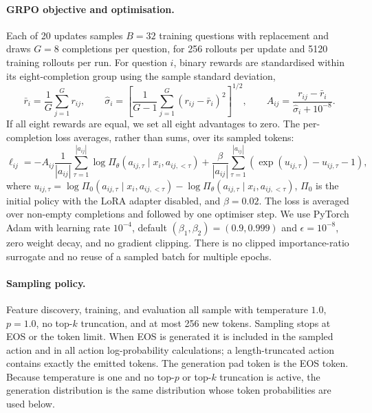 \paragraph{GRPO objective and optimisation.}
Each of 20 updates samples $B=32$ training questions with replacement and
draws $G=8$ completions per question, for 256 rollouts per update and 5120
training rollouts per run.  For question $i$, binary rewards are standardised
within its eight-completion group using the sample standard deviation,
\begin{equation*}
\bar r_i=\frac{1}{G}\sum_{j=1}^{G}r_{ij},
\qquad
\widehat{\sigma}_i
=
\left[\frac{1}{G-1}\sum_{j=1}^{G}(r_{ij}-\bar r_i)^2\right]^{1/2},
\qquad
A_{ij}=\frac{r_{ij}-\bar r_i}{\widehat{\sigma}_i+10^{-8}}.
\end{equation*}
If all eight rewards are equal, we set all eight advantages to zero.  The
per-completion loss averages, rather than sums, over its sampled tokens:
\begin{equation*}
\ell_{ij}
=
-A_{ij}\frac{1}{|a_{ij}|}\sum_{\tau=1}^{|a_{ij}|}
\log\Pi_\theta(a_{ij,\tau}\mid x_i,a_{ij,<\tau})
+
\frac{\beta}{|a_{ij}|}\sum_{\tau=1}^{|a_{ij}|}
\left(\exp(u_{ij,\tau})-u_{ij,\tau}-1\right),
\end{equation*}
where
$u_{ij,\tau}=\log\Pi_0(a_{ij,\tau}\mid x_i,a_{ij,<\tau})
-\log\Pi_\theta(a_{ij,\tau}\mid x_i,a_{ij,<\tau})$,
$\Pi_0$ is the initial policy with the LoRA adapter disabled, and
$\beta=0.02$.  The loss is averaged over non-empty completions and followed
by one optimiser step.  We use PyTorch Adam with learning rate $10^{-4}$,
default $(\beta_1,\beta_2)=(0.9,0.999)$ and $\epsilon=10^{-8}$, zero weight
decay, and no gradient clipping.  There is no clipped importance-ratio
surrogate and no reuse of a sampled batch for multiple epochs.

\paragraph{Sampling policy.}
Feature discovery, training, and evaluation all sample with temperature
$1.0$, $p=1.0$, no top-$k$ truncation, and at most 256 new tokens.  Sampling
stops at EOS or the token limit.  When EOS is generated it is included in
the sampled action and in all action log-probability calculations; a
length-truncated action contains exactly the emitted tokens.  The generation
pad token is the EOS token.  Because temperature is one and no top-$p$ or
top-$k$ truncation is active, the generation distribution is the same
distribution whose token probabilities are used below.

